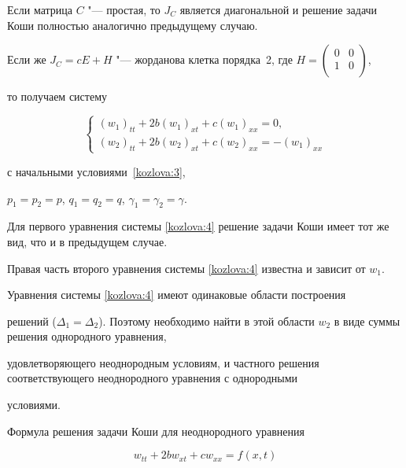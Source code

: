 Если матрица $C$ "--- простая, то $J_C$ является диагональной и решение задачи Коши полностью аналогично предыдущему случаю.

Если же $J_C=cE+H$ "--- жорданова клетка порядка~2, где $H=\left(\begin{matrix}

  0 & 0 \\

  1 & 0 \\

\end{matrix}\right)$,

то получаем систему

\begin{equation}

\label{kozlova:4}

\left\{

  \begin{array}{l}

    (w_1)_{tt}+2b(w_1)_{xt}+c(w_1)_{xx}=0, \\

    (w_2)_{tt}+2b(w_2)_{xt}+c(w_2)_{xx}=-(w_1)_{xx}

  \end{array}

\right.

\end{equation}

с начальными условиями~\eqref{kozlova:3},

$p_1=p_2=p$, $q_1=q_2=q$, $\gamma_1=\gamma_2=\gamma$.



Для первого уравнения системы \eqref{kozlova:4} решение задачи Коши имеет тот же вид, что и в предыдущем случае.

Правая часть второго уравнения системы \eqref{kozlova:4} известна и зависит от $w_1$.

Уравнения системы \eqref{kozlova:4} имеют одинаковые области построения

решений ($\Delta_{1}=\Delta_{2}$). Поэтому необходимо найти в этой области $w_2$ в виде суммы решения однородного уравнения,

удовлетворяющего неоднородным условиям, и частного решения соответствующего неоднородного уравнения с однородными

условиями.

Формула решения задачи Коши для неоднородного уравнения

\begin{equation*}

w_{tt}+2bw_{xt}+cw_{xx}=f(x,t)

\end{equation*}

